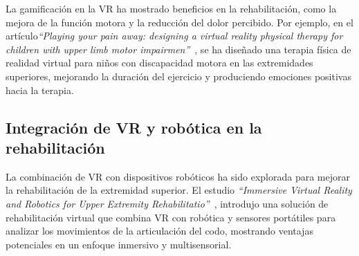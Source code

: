 La gamificación en la VR ha mostrado beneficios en la rehabilitación, como la mejora de la función motora y la reducción del dolor percibido. Por ejemplo, en el artículo\textit{``Playing your pain away: designing a virtual reality physical therapy for children with upper limb motor impairmen''}~\cite{vr_kids_pain2023}, se ha diseñado una terapia física de realidad virtual para niños con discapacidad motora en las extremidades superiores, mejorando la duración del ejercicio y produciendo emociones positivas hacia la terapia.

\subsection{Integración de VR y robótica en la rehabilitación}

La combinación de VR con dispositivos robóticos ha sido explorada para mejorar la rehabilitación de la extremidad superior. El estudio \textit{``Immersive Virtual Reality and Robotics for Upper Extremity Rehabilitatio''}~\cite{vr_robotics2023}, introdujo una solución de rehabilitación virtual que combina VR con robótica y sensores portátiles para analizar los movimientos de la articulación del codo, mostrando ventajas potenciales en un enfoque inmersivo y multisensorial.